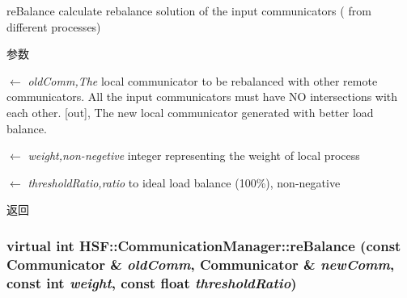 reBalance calculate rebalance solution of the input communicators ( from different processes) 
\begin{DoxyParams}{参数}
\item[\mbox{$\leftarrow$} {\em oldComm,The}]local communicator to be rebalanced with other remote communicators. All the input communicators must have NO intersections with each other. \mbox{[}out\mbox{]}, The new local communicator generated with better load balance. \item[\mbox{$\leftarrow$} {\em weight,non-\/negetive}]integer representing the weight of local process \item[\mbox{$\leftarrow$} {\em thresholdRatio,ratio}]to ideal load balance (100\%), non-\/negative \end{DoxyParams}
\begin{DoxyReturn}{返回}

\end{DoxyReturn}
\hypertarget{classHSF_1_1CommunicationManager_a23ed29de80835c5f413b2fefa2d98bdb}{
\subsubsection[{reBalance}]{\setlength{\rightskip}{0pt plus 5cm}virtual int HSF::CommunicationManager::reBalance (const {\bf Communicator} \& {\em oldComm}, \/  {\bf Communicator} \& {\em newComm}, \/  const int {\em weight}, \/  const float {\em thresholdRatio})}}
\label{classHSF_1_1CommunicationManager_a23ed29de80835c5f413b2fefa2d98bdb}


